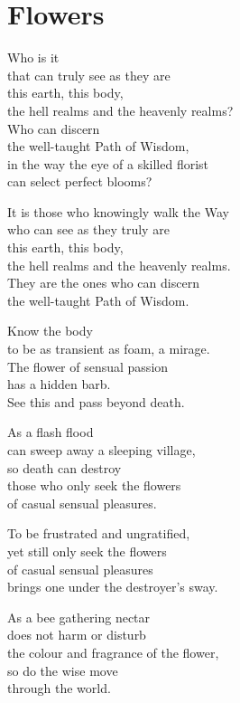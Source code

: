 
\chapter{Flowers}


Who is it\\
that can truly see as they are\\
this earth, this body,\\
the hell realms and the heavenly realms?\\
Who can discern\\
the well-taught Path of Wisdom,\\
in the way the eye of a skilled florist\\
can select perfect blooms?

It is those who knowingly walk the Way\\
who can see as they truly are\\
this earth, this body,\\
the hell realms and the heavenly realms.\\
They are the ones who can discern\\
the well-taught Path of Wisdom.


Know the body\\
to be as transient as foam, a mirage.\\
The flower of sensual passion\\
has a hidden barb.\\
See this and pass beyond death.


As a flash flood\\
can sweep away a sleeping village,\\
so death can destroy\\
those who only seek the flowers\\
of casual sensual pleasures.


To be frustrated and ungratified,\\
yet still only seek the flowers\\
of casual sensual pleasures\\
brings one under the destroyer's sway.


As a bee gathering nectar\\
does not harm or disturb\\
the colour and fragrance of the flower,\\
so do the wise move\\
through the world.


